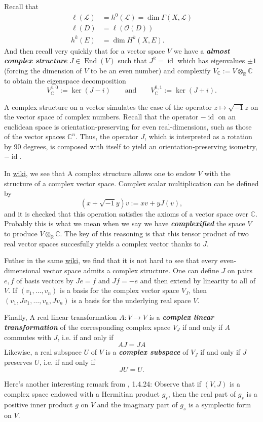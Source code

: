 \documentclass{article}
\newcommand{\R}{\mathbb{R}}
\newcommand{\C}{\mathbb{C}}
\newcommand{\Lc}{\mathcal{L}}
\newcommand{\Oc}{\mathcal{O}}
\DeclareMathOperator{\id}{id}
\DeclareMathOperator{\End}{End}
\begin{document}
Recall that
\begin{align*}
	\ell(\Lc)&=h^0(\Lc)=\dim\Gamma(X,\Lc)\\
	\ell(D)&=\ell(\Oc(D))\\
	h^k(E)&=\dim H^k(X,E).
\end{align*}
And then recall very quickly that for a vector space $V$ we have a \textbf{\textit{almost complex structure}} $J\in\End(V)$ such that $J^2=\id$ which has eigenvalues $\pm1$ (forcing the dimension of $V$ to be an even number) and complexify $V_\C:=V\otimes_\R\C$ to obtain the eigenspace decomposition
\[V^{1,0}_{\C}:=\ker(J-i)\qquad\text{and}\qquad V^{0,1}_{\C}:=\ker(J+i).\]
\begin{remark}
	A complex structure on a vector simulates the case of the operator $z\mapsto \sqrt{-1}z$ on the vector space of complex numbers. Recall that the operator $-\id$ on an euclidean space is orientation-preserving for even real-dimensions, such as those of the vector spaces $\C^n$. Thus, the operator $J$, which is interpreted as a rotation by 90 degrees, is composed with itself to yield an orientation-preserving isometry, $-\id$.
	
	In \href{https://en.wikipedia.org/wiki/Linear_complex_structure#Definition_and_properties}{wiki}, we see that A complex structure allows one to endow $V$ with the structure of a complex vector space. Complex scalar multiplication can be defined by
	\[(x+\sqrt{-1}y)v:=xv+yJ(v),\]
	and it is checked that this operation satisfies the axioms of a vector space over $\C$. {\color{cyan}Probably this is what we mean when we say we have \textbf{\textit{complexified}} the space $V$ to produce $V\otimes_\R\C$. The key of this reasoning is that this tensor product of two real vector spaces succesfully yields a complex vector thanks to $J$.}
	
	Futher in the same \href{https://en.wikipedia.org/wiki/Linear_complex_structure#Definition_and_properties}{wiki}, we find that it is not hard to see that every even-dimensional vector space admits a complex structure. One can define $J$ on pairs $e,f$ of basis vectors by $Je = f$ and $Jf = -e$ and then extend by linearity to all of $V$. If $(v_1, \ldots, v_n)$ is a basis for the complex vector space $V_J$, then $(v_1,Jv_1,\ldots,v_n,Jv_n)$ is a basis for the underlying real space $V$.
	
	Finally, A real linear transformation $A : V \to V$ is a \textbf{\textit{complex linear transformation}} of the corresponding complex space $V_J$ if and only if $A$ commutes with $J$, i.e. if and only if
	\[AJ=JA\]
	Likewise, a real subspace $U$ of $V$ is a \textbf{\textit{complex subspace}} of $V_J$ if and only if $J$ preserves $U$, i.e. if and only if
	\[JU=U.\]
\end{remark}
\begin{remark}
	Here's another interesting remark from \cite{piccione}, 1.4.24: Observe that if $(V,J)$ is a complex space endowed with a Hermitian product $g_s$, then the real part of $g_s$ is a positive inner product $g$ on $V$ and the imaginary part of $g_s$ is a symplectic form on $V$. 
\end{remark}
\end{document}
